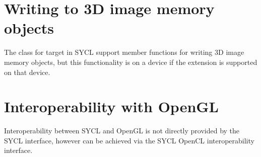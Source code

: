 \section{Writing to 3D image memory objects}

The  class for target
 in SYCL support member functions for writing
3D image memory objects, but this functionality is  on a device if the extension  is
supported on that \gls{device}.

\section{Interoperability with OpenGL}

Interoperability between SYCL and OpenGL is not directly provided by the SYCL interface,
however can be achieved via the SYCL OpenCL interoperability interface.

\clearpage

